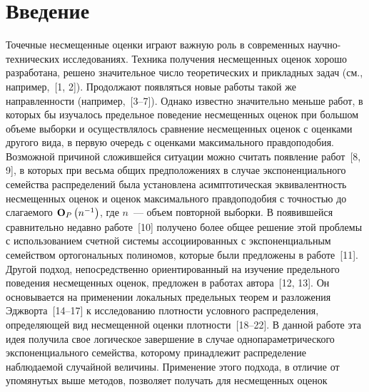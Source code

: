 

      \thispagestyle{headings}

      \begin{multicols}{2}

      \label{st\stat}

\section{Введение}

  Точечные несмещенные оценки играют важную роль в современных
  научно-технических исследованиях. Техника получения несмещенных
  оценок хорошо разработана, решено значительное число
  теоретических и прикладных задач (см., например,~[1, 2]).
  Продолжают появляться новые работы  такой же направленности
  (например,~[3--7]). Однако известно значительно меньше работ, в которых
  бы изучалось предельное поведение несмещенных оценок при большом
  объеме выборки и осуществлялось сравнение несмещенных оценок с
  оценками другого вида, в первую очередь с оценками максимального правдоподобия.
  Возможной причиной сложившейся ситуации можно считать
  появление работ~[8, 9], в которых при весьма общих предположениях в
  случае экспоненциального семейства распределений была
  установлена асимптотическая эквивалентность несмещенных оценок и
  оценок максимального правдоподобия с точностью
  до слагаемого ${\bf O}_P\left( n^{-1}\right)$, где $n$~--- объем
  повторной выборки.
   В появившейся сравнительно недавно работе~[10] получено более
  общее решение этой проблемы с использованием счетной системы
  ассоциированных с экспоненциальным семейством ортогональных
  полиномов, которые были предложены в работе~[11].
   Другой подход, непосредственно ориентированный на изучение предельного
  поведения несмещенных оценок, предложен в работах автора~[12, 13].
  Он основывается на применении локальных предельных теорем
  и разложения Эджворта~[14--17] к исследованию плотности
  условного распределения, определяющей вид несмещенной оценки
  плотности~[18--22].
   В данной работе эта идея получила свое логическое завершение
  в случае однопараметрического экспоненциального семейства,
  которому принадлежит распределение наблюдаемой случайной величины.\linebreak
   Применение этого подхода, в отличие от упомянутых выше методов,
  позволяет получать для несмещенных оценок

\end{multicols}
